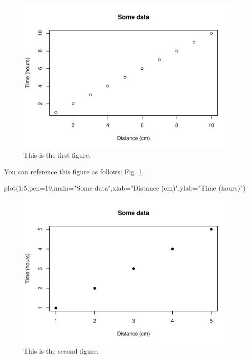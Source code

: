 \documentclass[12pt,halfline,a4paper,]{ouparticle}
\newenvironment{Shaded}{\begin{snugshade}}{\end{snugshade}}
\newcommand{\AttributeTok}[1]{\textcolor[rgb]{0.77,0.63,0.00}{#1}}
\newcommand{\DecValTok}[1]{\textcolor[rgb]{0.00,0.00,0.81}{#1}}
\newcommand{\FunctionTok}[1]{\textcolor[rgb]{0.00,0.00,0.00}{#1}}
\newcommand{\NormalTok}[1]{#1}
\newcommand{\SpecialCharTok}[1]{\textcolor[rgb]{0.00,0.00,0.00}{#1}}
\newcommand{\StringTok}[1]{\textcolor[rgb]{0.31,0.60,0.02}{#1}}
\begin{document}
\begin{figure}[p]
\includegraphics[width=1\linewidth]{Test-Article-Output_files/figure-latex/fig1-1} \caption{This is the first figure.}\label{fig:fig1}
\end{figure}

You can reference this figure as follows: Fig. \ref{fig:fig1}.

\begin{Shaded}
\begin{Highlighting}[]
\FunctionTok{plot}\NormalTok{(}\DecValTok{1}\SpecialCharTok{:}\DecValTok{5}\NormalTok{,}\AttributeTok{pch=}\DecValTok{19}\NormalTok{,}\AttributeTok{main=}\StringTok{"Some data"}\NormalTok{,}\AttributeTok{xlab=}\StringTok{"Distance (cm)"}\NormalTok{,}\AttributeTok{ylab=}\StringTok{"Time (hours)"}\NormalTok{)}
\end{Highlighting}
\end{Shaded}

\begin{figure}[p]
\includegraphics[width=1\linewidth]{Test-Article-Output_files/figure-latex/fig2-1} \caption{This is the second figure.}\label{fig:fig2}
\end{figure}
\end{document}
